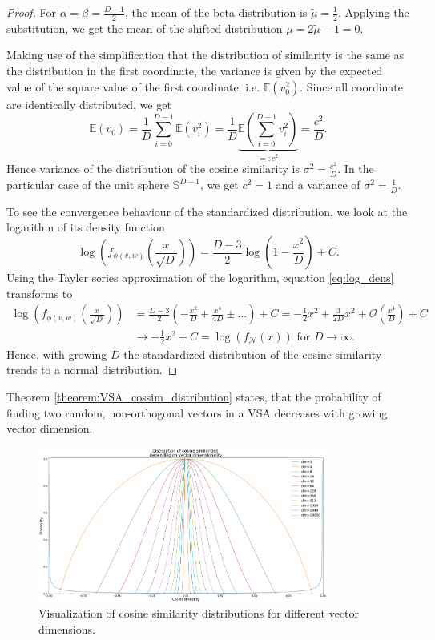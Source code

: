 \begin{proof}
	For $\alpha=\beta=\frac{D-1}{2}$, the mean of the beta distribution is $\tilde{\mu}=\frac{1}{2}$. Applying the substitution, we get the mean of the shifted distribution $\mu = 2\tilde{\mu }-1 = 0$.
    
	Making use of the simplification that the distribution of similarity is the same as the distribution in the first coordinate, the variance is given by the expected value of the square value of the first coordinate, i.e. $\mathbb{E}(v_{0}^{2})$.
	Since all coordinate are identically distributed, we get
	\[
	\mathbb{E}(v_{0}) = \frac{1}{D} \sum_{i=0}^{D-1} \mathbb{E}(v_{i}^2)= \frac{1}{D} \underbrace{\mathbb{E}\left(\sum_{i=0}^{D-1} v_{i}^2\right)}_{=:c^2}=\frac{c^2}{D}.
	\]
	Hence variance of the distribution of the cosine similarity is $\sigma^2=\frac{c^2}{D}$.
	In the particular case of the unit sphere $\mathbb{S}^{D-1}$, we get $c^{2}=1$ and a variance of $\sigma^2=\frac{1}{D}$.
    
	To see the convergence behaviour of the standardized distribution, we look at the logarithm of its density function %
	\begin{equation}
	\label{eq:log_dens}
	\log\left(f_{\phi(v,w)}\left(\frac{x}{\sqrt{D}}\right)\right) = \frac{D-3}{2}\log\left(1-\frac{x^2}{D}\right) + C.
	\end{equation}
	Using the Tayler series approximation of the logarithm, equation \ref{eq:log_dens} transforms to
	\begin{align*}
		\log\left(f_{\phi(v,w)}\left(\frac{x}{\sqrt{D}}\right)\right) &= \frac{D-3}{2}\left(-\frac{x^2}{D} + \frac{x^4}{4D} \pm \ldots \right) + C = -\frac{1}{2}x^2 + \frac{3}{2D}x^2 + \mathcal{O}\left(\frac{x^4}{D}\right)  + C  \\
		&\longrightarrow -\frac{1}{2}x^2 + C = \log\left(f_{\mathcal{N}}\left(x\right)\right) \textrm{ for } D \longrightarrow \infty.
	\end{align*}
	Hence, with growing $D$ the standardized distribution of the cosine similarity trends to a normal distribution.
\end{proof}
Theorem \ref{theorem:VSA_cossim_distribution} states, that the probability of finding two random, non-orthogonal vectors in a \ac{VSA} decreases with growing vector dimension.
\begin{figure}[t!]
	\centering
	\includegraphics[width=0.85\textwidth]{imgs/distributions_cosine_sims.eps}
	\caption{Visualization of cosine similarity distributions for different vector dimensions.}
	\label{fig:cosine_dist}
\end{figure}
